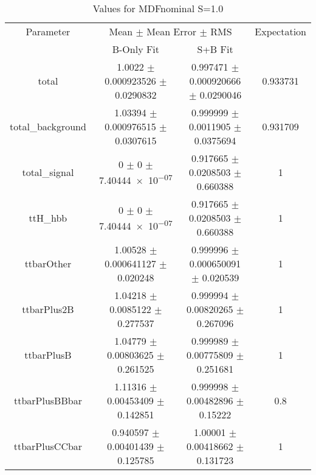 \begin{table}
\centering
\caption{Values for MDFnominal S=1.0}
\begin{tabular}{cccc}
\toprule
Parameter & \multicolumn{2}{c}{Mean $\pm$ Mean Error $\pm$ RMS} & Expectation\\
 & B-Only Fit & S+B Fit & \\
\midrule
total & \num{1.0022} $\pm$ \num{0.000923526} $\pm$ \num{0.0290832} & \num{0.997471} $\pm$ \num{0.000920666} $\pm$ \num{0.0290046} & \num{0.933731}\\
total\_background & \num{1.03394} $\pm$ \num{0.000976515} $\pm$ \num{0.0307615} & \num{0.999999} $\pm$ \num{0.0011905} $\pm$ \num{0.0375694} & \num{0.931709}\\
total\_signal & \num{0} $\pm$ \num{0} $\pm$ \num{7.40444e-07} & \num{0.917665} $\pm$ \num{0.0208503} $\pm$ \num{0.660388} & \num{1}\\
ttH\_hbb & \num{0} $\pm$ \num{0} $\pm$ \num{7.40444e-07} & \num{0.917665} $\pm$ \num{0.0208503} $\pm$ \num{0.660388} & \num{1}\\
ttbarOther & \num{1.00528} $\pm$ \num{0.000641127} $\pm$ \num{0.020248} & \num{0.999996} $\pm$ \num{0.000650091} $\pm$ \num{0.020539} & \num{1}\\
ttbarPlus2B & \num{1.04218} $\pm$ \num{0.0085122} $\pm$ \num{0.277537} & \num{0.999994} $\pm$ \num{0.00820265} $\pm$ \num{0.267096} & \num{1}\\
ttbarPlusB & \num{1.04779} $\pm$ \num{0.00803625} $\pm$ \num{0.261525} & \num{0.999989} $\pm$ \num{0.00775809} $\pm$ \num{0.251681} & \num{1}\\
ttbarPlusBBbar & \num{1.11316} $\pm$ \num{0.00453409} $\pm$ \num{0.142851} & \num{0.999998} $\pm$ \num{0.00482896} $\pm$ \num{0.15222} & \num{0.8}\\
ttbarPlusCCbar & \num{0.940597} $\pm$ \num{0.00401439} $\pm$ \num{0.125785} & \num{1.00001} $\pm$ \num{0.00418662} $\pm$ \num{0.131723} & \num{1}\\
\bottomrule
\end{tabular}
\end{table}
